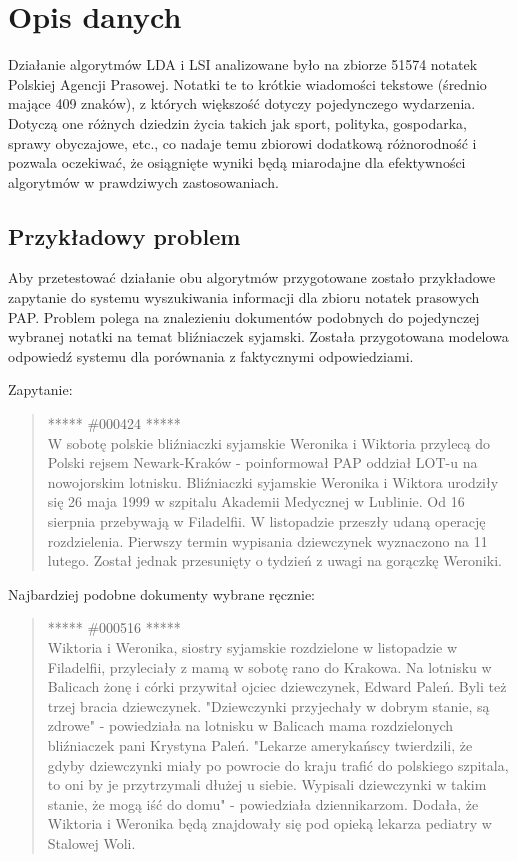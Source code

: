 \documentclass[11pt,a4paper]{article}
\begin{document}
\section{Opis danych}
\label{sec:data}
\label{data-description}

Działanie algorytmów LDA i LSI analizowane było na zbiorze 51574 notatek
Polskiej Agencji Prasowej. Notatki te to krótkie wiadomości tekstowe (średnio
mające 409 znaków), z których większość dotyczy pojedynczego wydarzenia.
Dotyczą one różnych dziedzin życia takich jak sport, polityka, gospodarka,
sprawy obyczajowe, etc., co nadaje temu zbiorowi dodatkową różnorodność i
pozwala oczekiwać, że osiągnięte wyniki będą miarodajne dla efektywności
algorytmów w prawdziwych zastosowaniach.

\subsection{Przykładowy problem}
\label{sec:example}

Aby przetestować działanie obu algorytmów przygotowane zostało przykładowe
zapytanie do systemu wyszukiwania informacji dla zbioru notatek prasowych PAP.
Problem polega na znalezieniu dokumentów podobnych do pojedynczej wybranej
notatki na temat bliźniaczek syjamski. Została przygotowana modelowa odpowiedź
systemu dla porównania z faktycznymi odpowiedziami.

Zapytanie:

\begin{quote} ***** \#000424 *****\\ W sobotę polskie bliźniaczki syjamskie
Weronika i Wiktoria przylecą do Polski rejsem Newark-Kraków - poinformował PAP
oddział LOT-u na nowojorskim lotnisku.  Bliźniaczki syjamskie Weronika i
Wiktora urodziły się 26 maja 1999 w szpitalu Akademii Medycznej w Lublinie. Od
16 sierpnia przebywają w Filadelfii. W listopadzie przeszły udaną operację
rozdzielenia. Pierwszy termin wypisania dziewczynek wyznaczono na 11 lutego.
Został jednak przesunięty o tydzień z uwagi na gorączkę Weroniki.  \end{quote}

Najbardziej podobne dokumenty wybrane ręcznie:

\begin{quote} ***** \#000516 *****\\ Wiktoria i Weronika, siostry syjamskie
rozdzielone w listopadzie w Filadelfii, przyleciały z mamą w sobotę rano do
Krakowa. Na lotnisku w Balicach żonę i córki przywitał ojciec dziewczynek,
Edward Paleń. Byli też trzej bracia dziewczynek.  "Dziewczynki przyjechały w
dobrym stanie, są zdrowe" - powiedziała na lotnisku w Balicach mama
rozdzielonych bliźniaczek pani Krystyna Paleń. "Lekarze amerykańscy twierdzili,
że gdyby dziewczynki miały po powrocie do kraju trafić do polskiego szpitala,
to oni by je przytrzymali dłużej u siebie. Wypisali dziewczynki w takim stanie,
że mogą iść do domu" - powiedziała dziennikarzom. Dodała, że Wiktoria i
Weronika będą znajdowały się pod opieką lekarza pediatry w Stalowej Woli.
\end{quote}
\end{document}
